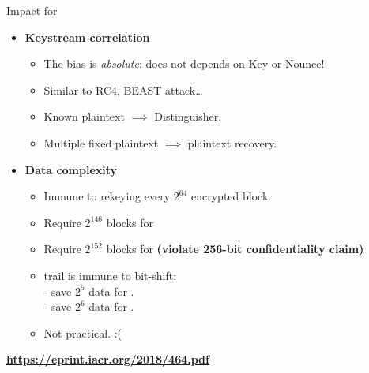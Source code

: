 \documentclass[aspectratio=169,9pt]{beamer}
\begin{document}
\begin{frame}{Impact for \MORUS}

\begin{itemize}
  \item \textbf{Keystream correlation}
    \begin{itemize}
      \item The bias is \textit{absolute}: does not depends on Key or Nounce!
      \item Similar to RC4, BEAST attack\ldots
      \item Known plaintext $\implies$ Distinguisher.
      \item Multiple fixed plaintext $\implies$ plaintext recovery.
    \end{itemize}
  \pause
  \item \textbf{Data complexity}
    \begin{itemize}
      \item Immune to rekeying every $2^{64}$ encrypted block.
      \item Require $2^{146}$ blocks for \MORUS[640]
      \item Require $2^{152}$ blocks for \MORUS[1280] \textbf{\alert{(violate 256-bit confidentiality claim)}}
      \item trail is immune to bit-shift:\\
        - save $2^5$ data for \MORUS[640].\\
        - save $2^6$ data for \MORUS[1280].\\
      \item Not practical. :(
    \end{itemize}
\end{itemize}

\end{frame}


\begin{frame}[standout]

\centerline{\huge\textbf{\url{https://eprint.iacr.org/2018/464.pdf}}}

\end{frame}
\end{document}
